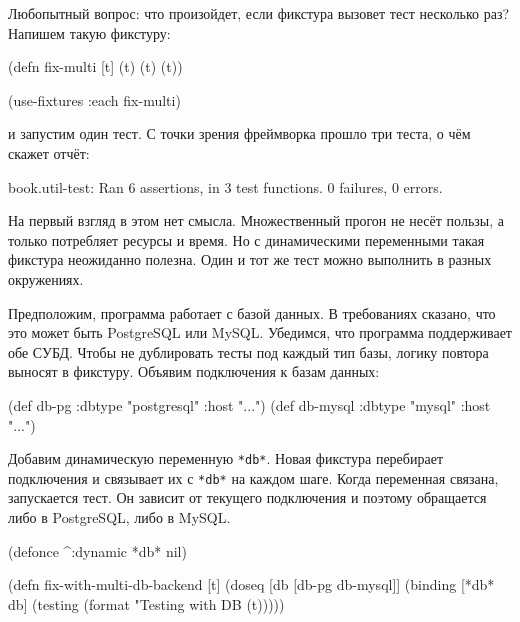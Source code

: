 \label{multi-fixture}


Любопытный вопрос: что произойдет, если фикстура вызовет тест несколько раз?
Напишем такую фикстуру:

\begin{english}
  \begin{clojure}
(defn fix-multi [t]
  (t) (t) (t))

(use-fixtures :each fix-multi)
  \end{clojure}
\end{english}

\noindent
и запустим один тест. С точки зрения фреймворка прошло три теста, о чём скажет
отчёт:

\begin{english}
  \begin{text}
book.util-test: Ran 6 assertions, in 3 test functions.
0 failures, 0 errors.
  \end{text}
\end{english}

На первый взгляд в этом нет смысла. Множественный прогон не несёт пользы, а
только потребляет ресурсы и время. Но с динамическими переменными такая фикстура
неожиданно полезна. Один и тот же тест можно выполнить в разных окружениях.

Предположим, программа работает с базой данных. В требованиях сказано, что это
может быть PostgreSQL или MySQL. Убедимся, что программа поддерживает обе
СУБД. Чтобы не дублировать тесты под каждый тип базы, логику повтора выносят в
фикстуру. Объявим подключения к базам данных:


\begin{english}
  \begin{clojure}
(def db-pg    {:dbtype "postgresql" :host "..."})
(def db-mysql {:dbtype "mysql"      :host "..."})
  \end{clojure}
\end{english}

Добавим динамическую переменную \verb|*db*|. Новая фикстура перебирает
подключения и связывает их с \verb|*db*| на каждом шаге. Когда переменная
связана, запускается тест. Он зависит от текущего подключения и поэтому
обращается либо в PostgreSQL, либо в MySQL.

\begin{english}
  \begin{clojure}
(defonce ^:dynamic *db* nil)

(defn fix-with-multi-db-backend [t]
  (doseq [db [db-pg db-mysql]]
    (binding [*db* db]
      (testing (format "Testing with DB %
        (t)))))
  \end{clojure}
\end{english}

